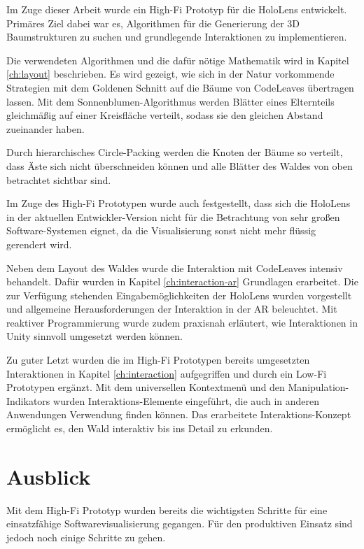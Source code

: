 Im Zuge dieser Arbeit wurde ein High-Fi Prototyp für die HoloLens entwickelt. Primäres Ziel dabei war es, Algorithmen für die Generierung der 3D Baumstrukturen zu suchen und grundlegende Interaktionen zu implementieren.

Die verwendeten Algorithmen und die dafür nötige Mathematik wird in Kapitel \ref{ch:layout} beschrieben. Es wird gezeigt, wie sich in der Natur vorkommende Strategien mit dem Goldenen Schnitt auf die Bäume von CodeLeaves übertragen lassen. Mit dem Sonnenblumen-Algorithmus werden Blätter eines Elternteils gleichmäßig auf einer Kreisfläche verteilt, sodass sie den gleichen Abstand zueinander haben.

Durch hierarchisches Circle-Packing werden die Knoten der Bäume so verteilt, dass Äste sich nicht überschneiden können und alle Blätter des Waldes von oben betrachtet sichtbar sind.

Im Zuge des High-Fi Prototypen wurde auch festgestellt, dass sich die HoloLens in der aktuellen Entwickler-Version nicht für die Betrachtung von sehr großen Software-Systemen eignet, da die Visualisierung sonst nicht mehr flüssig gerendert wird.

Neben dem Layout des Waldes wurde die Interaktion mit CodeLeaves intensiv behandelt. Dafür wurden in Kapitel \ref{ch:interaction-ar} Grundlagen erarbeitet. Die zur Verfügung stehenden Eingabemöglichkeiten der HoloLens wurden vorgestellt und allgemeine Herausforderungen der Interaktion in der AR beleuchtet. Mit reaktiver Programmierung wurde zudem praxisnah erläutert, wie Interaktionen in Unity sinnvoll umgesetzt werden können.

Zu guter Letzt wurden die im High-Fi Prototypen bereits umgesetzten Interaktionen in Kapitel \ref{ch:interaction} aufgegriffen und durch ein Low-Fi Prototypen ergänzt. Mit dem universellen Kontextmenü und den Manipulation-Indikators wurden Interaktions-Elemente eingeführt, die auch in anderen Anwendungen Verwendung finden können. Das erarbeitete Interaktions-Konzept ermöglicht es, den Wald interaktiv bis ins Detail zu erkunden.

\section{Ausblick}

Mit dem High-Fi Prototyp wurden bereits die wichtigsten Schritte für eine einsatzfähige Softwarevisualisierung gegangen. Für den produktiven Einsatz sind jedoch noch einige Schritte zu gehen.

